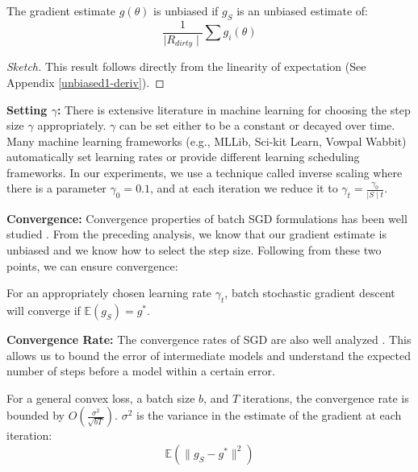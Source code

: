 \begin{lemma}\label{unbiased1}
The gradient estimate $g(\theta)$ is unbiased if $g_S$ is an unbiased estimate of:
\[
\frac{1}{\mid R_{dirty} \mid} \sum g_i(\theta)
\]
\end{lemma}
\begin{proof}[Sketch]
This result follows directly from the linearity of expectation (See Appendix \ref{unbiased1-deriv}).
\end{proof}

\vspace{0.25em}

\noindent\textbf{ Setting $\gamma$: } There is extensive literature in machine learning for choosing the step size $\gamma$ appropriately. $\gamma$ can be set either to be a constant or decayed over time. Many machine learning frameworks (e.g., MLLib, Sci-kit Learn, Vowpal Wabbit) automatically set learning rates or provide different learning scheduling frameworks. 
In our experiments, we use a technique called inverse scaling where there is a parameter $\gamma_0=0.1$, and at each iteration we reduce it to $\gamma_t = \frac{\gamma_0}{\mid S \mid t}$. 

\vspace{0.25em}

\noindent\textbf{ Convergence: } Convergence properties of batch SGD formulations has been well studied \cite{dekel2012optimal}. From the preceding analysis, we know that our gradient estimate is unbiased and we know how to select the step size. Following from these two points, we can ensure convergence: 

\begin{proposition}
For an appropriately chosen learning rate $\gamma_t$, batch stochastic gradient descent will converge if $\mathbb{E}(g_S)=g^*$.
\label{unbiased}
\end{proposition}

\vspace{0.25em}

\noindent\textbf{ Convergence Rate: } The convergence rates of SGD are also well analyzed \cite{dekel2012optimal,bertsekas2011incremental,zhao2014stochastic}. 
This allows us to bound the error of intermediate models and understand the expected number of steps before a model within a certain error. 

\begin{proposition}
For a general convex loss, a batch size $b$, and $T$ iterations, the convergence rate is bounded by $O(\frac{\sigma^2}{\sqrt{bT}})$. 
$\sigma^2$ is the variance in the estimate of the gradient at each iteration:
\[
\mathbb{E}(\|g_S - g^*\|^2)
\]
\end{proposition}

